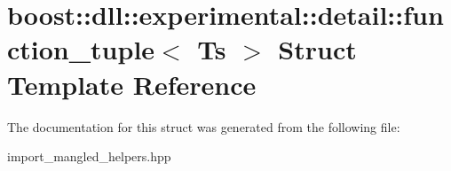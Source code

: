 \hypertarget{a01464}{}\section{boost\+:\+:dll\+:\+:experimental\+:\+:detail\+:\+:function\+\_\+tuple$<$ Ts $>$ Struct Template Reference}
\label{a01464}


The documentation for this struct was generated from the following file\+:\begin{DoxyCompactItemize}
\item 
import\+\_\+mangled\+\_\+helpers.\+hpp\end{DoxyCompactItemize}
